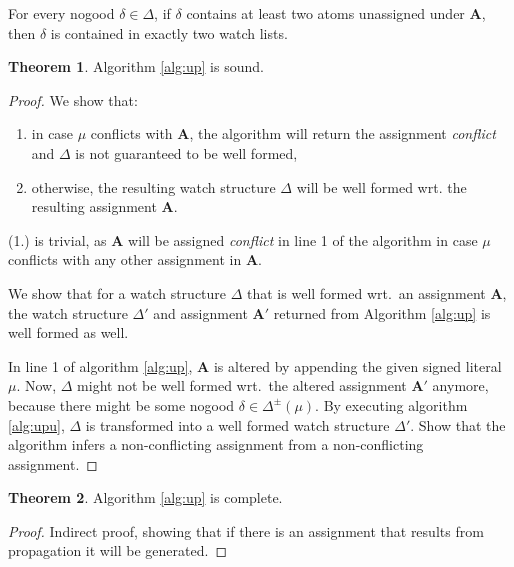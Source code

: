 \documentclass{vutinfth} %
\theoremstyle{example}
\theoremstyle{definition}
\theoremstyle{theorem}
\newtheorem{theorem}{Theorem}[section]
\theoremstyle{lemma}
\theoremstyle{corollary}
\newcommand{\ass}{\mathbf{A}}
\newcommand{\sgl}{\mu}
\begin{document}



For every nogood $\delta \in \Delta$, if $\delta$ contains at least two atoms unassigned under $\ass$, then $\delta$ is contained in exactly two watch lists.

\begin{theorem}
Algorithm \ref{alg:up} is sound.
\end{theorem}

\begin{proof}
We show that:

\begin{enumerate}
\item in case $\sgl$ conflicts with $\ass$, the algorithm will return the assignment \emph{conflict} and $\Delta$ is not guaranteed to be well formed,
\item otherwise, the resulting watch structure $\Delta$ will be well formed wrt. the resulting assignment $\ass$.
\end{enumerate}

(1.) is trivial, as $\ass$ will be assigned \emph{conflict} in line 1 of the algorithm in case $\sgl$ conflicts with any other assignment in $\ass$.

We show that for a watch structure $\Delta$ that is well formed wrt.~an assignment $\ass$, the watch structure $\Delta'$ and assignment $\ass'$ returned from Algorithm \ref{alg:up} is well formed as well.

In line 1 of algorithm \ref{alg:up}, $\ass$ is altered by appending the given signed literal $\sgl$. Now, $\Delta$ might not be well formed wrt.~the altered assignment $\ass'$ anymore, because there might be some nogood $\delta \in \Delta^\pm(\sgl)$. By executing algorithm \ref{alg:upu}, $\Delta$ is transformed into a well formed watch structure $\Delta'$.
Show that the algorithm infers a non-conflicting assignment from a non-conflicting assignment.
\end{proof}

\begin{theorem}
Algorithm \ref{alg:up} is complete.
\end{theorem}

\begin{proof}
Indirect proof, showing that if there is an assignment that results from propagation it will be generated.
\end{proof}
\end{document}

